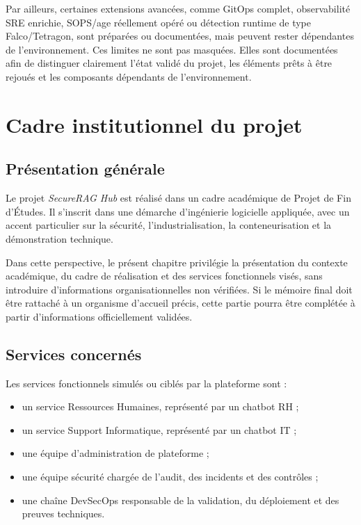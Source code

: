 Par ailleurs, certaines extensions avancées, comme GitOps complet, observabilité SRE enrichie, SOPS/age réellement opéré ou détection runtime de type Falco/Tetragon, sont préparées ou documentées, mais peuvent rester dépendantes de l’environnement. Ces limites ne sont pas masquées. Elles sont documentées afin de distinguer clairement l’état validé du projet, les éléments prêts à être rejoués et les composants dépendants de l’environnement.

\section{Cadre institutionnel du projet}

\subsection{Présentation générale}

Le projet \textit{SecureRAG Hub} est réalisé dans un cadre académique de Projet de Fin d’Études. Il s’inscrit dans une démarche d’ingénierie logicielle appliquée, avec un accent particulier sur la sécurité, l’industrialisation, la conteneurisation et la démonstration technique.

Dans cette perspective, le présent chapitre privilégie la présentation du contexte académique, du cadre de réalisation et des services fonctionnels visés, sans introduire d’informations organisationnelles non vérifiées. Si le mémoire final doit être rattaché à un organisme d’accueil précis, cette partie pourra être complétée à partir d’informations officiellement validées.

\subsection{Services concernés}

Les services fonctionnels simulés ou ciblés par la plateforme sont :

\begin{itemize}
    \item un service Ressources Humaines, représenté par un chatbot RH ;
    \item un service Support Informatique, représenté par un chatbot IT ;
    \item une équipe d’administration de plateforme ;
    \item une équipe sécurité chargée de l’audit, des incidents et des contrôles ;
    \item une chaîne DevSecOps responsable de la validation, du déploiement et des preuves techniques.
\end{itemize}

